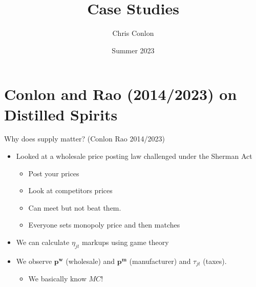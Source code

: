 

\usepackage{lipsum}
\usepackage{amsmath} 
\usepackage{amsthm} 
\usepackage{amssymb} 
\usepackage{mathtools}
\usepackage{dutchcal}


\newcommand{\vect}[1]{\boldsymbol{\mathbf{#1}}}
\newcommand{\pd}[2]{\frac{\partial{#1}}{\partial{#2}}}
\newcommand{\expect}[2]{\mathbb{E}_{#1}\left[{#2}\right]}
\newcommand{\expectsmall}[2]{\mathbb{E}_{#1}{#2}}
\newcommand{\expectsuper}[3]{\mathbb{E}_{#1}^{#2}\left[{#3}\right]}
\newcommand{\ind}[1]{\mathbbm{1}\left\{{#1}\right\}}
\newcommand{\prob}[1]{\mathbb{P}\left\{{#1}\right\}}
\newcommand{\derivative}[2]{\frac{d{#2}}{d{#1}}}
\newcommand{\cat}[1]{\citeasnoun{#1}}

\title{Case Studies}
\author{Chris Conlon}

\date{Summer 2023}








\begin{frame}[plain] %
\titlepage
\end{frame}



\section*{Conlon and Rao (2014/2023) on Distilled Spirits}



\begin{frame}{Why does supply matter? (Conlon Rao 2014/2023)}
\begin{itemize}
\item Looked at a wholesale price posting law challenged under the Sherman Act
\begin{itemize}
\item Post your prices
\item Look at competitors prices
\item Can meet but not beat them.
\item \textrightarrow Everyone sets monopoly price and then matches
\end{itemize}
\item We can calculate $\eta_{jt}$ markups using game theory
\item We observe $\mathbf{p^w}$ (wholesale) and $\mathbf{p^m}$ (manufacturer) and $\tau_{jt}$ (taxes).
\begin{itemize}
\item We basically know $MC$!
\end{itemize}
\end{itemize}
\end{frame}






